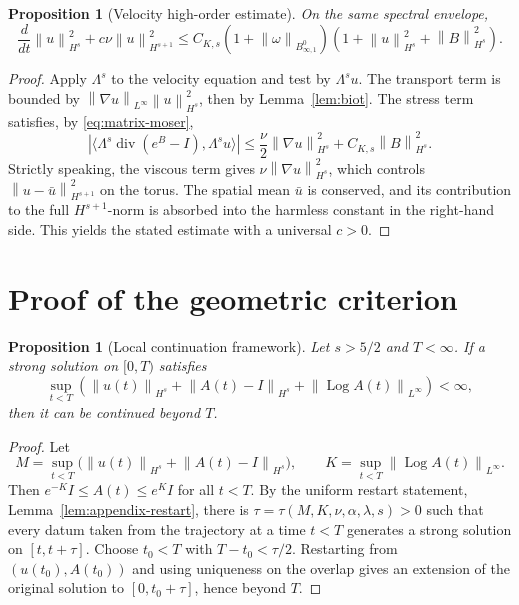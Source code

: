 \documentclass[10pt,a4paper]{amsart}
\numberwithin{equation}{section}
\newtheorem{proposition}[theorem]{Proposition}
\newcommand{\Id}{I}
\newcommand{\divv}{\operatorname{div}}
\newcommand{\Log}{\operatorname{Log}}
\newcommand{\Besov}{B^0_{\infty,1}}
\newcommand{\norm}[1]{\left\lVert #1\right\rVert}
\begin{document}
\begin{proposition}[Velocity high-order estimate]
\label{prop:u-Hs}
On the same spectral envelope,
\begin{equation}
  \frac{d}{dt}\norm{u}_{H^s}^2+c\nu\norm{u}_{H^{s+1}}^2
  \le
  C_{K,s}(1+\norm{\omega}_{\Besov})
  (1+\norm{u}_{H^s}^2+\norm{B}_{H^s}^2).
  \label{eq:u-Hs}
\end{equation}
\end{proposition}

\begin{proof}
Apply \(\Lambda^s\) to the velocity equation and test by \(\Lambda^su\).  The
transport term is bounded by \(\norm{\nabla u}_{L^\infty}\norm{u}_{H^s}^2\),
then by Lemma~\ref{lem:biot}.  The stress term satisfies, by
\eqref{eq:matrix-moser},
\[
  \left|
  \langle\Lambda^s\divv(e^B-\Id),\Lambda^su\rangle
  \right|
  \le
  \frac{\nu}{2}\norm{\nabla u}_{H^s}^2
  +C_{K,s}\norm{B}_{H^s}^2 .
\]
Strictly speaking, the viscous term gives
\(\nu\norm{\nabla u}_{H^s}^2\), which controls
\(\norm{u-\bar u}_{H^{s+1}}^2\) on the torus.  The spatial mean
\(\bar u\) is conserved, and its contribution to the full
\(H^{s+1}\)-norm is absorbed into the harmless constant in the right-hand
side.  This yields the stated estimate with a universal \(c>0\).
\end{proof}

\section{Proof of the geometric criterion}

\begin{proposition}[Local continuation framework]
\label{prop:local}
Let \(s>5/2\) and \(T<\infty\).  If a strong solution on \([0,T)\) satisfies
\[
  \sup_{t<T}\left(
  \norm{u(t)}_{H^s}
  +\norm{A(t)-\Id}_{H^s}
  +\norm{\Log A(t)}_{L^\infty}
  \right)<\infty,
\]
then it can be continued beyond \(T\).
\end{proposition}

\begin{proof}
Let
\[
  M=\sup_{t<T}\bigl(\norm{u(t)}_{H^s}+\norm{A(t)-\Id}_{H^s}\bigr),
  \qquad
  K=\sup_{t<T}\norm{\Log A(t)}_{L^\infty}.
\]
Then \(e^{-K}\Id\le A(t)\le e^K\Id\) for all \(t<T\).  By the uniform restart
statement, Lemma~\ref{lem:appendix-restart}, there is
\(\tau=\tau(M,K,\nu,\alpha,\lambda,s)>0\) such that every datum taken from the
trajectory at a time \(t<T\) generates a strong solution on
\([t,t+\tau]\).  Choose \(t_0<T\) with \(T-t_0<\tau/2\).  Restarting from
\((u(t_0),A(t_0))\) and using uniqueness on the overlap gives an extension of
the original solution to \([0,t_0+\tau]\), hence beyond \(T\).
\end{proof}
\end{document}
